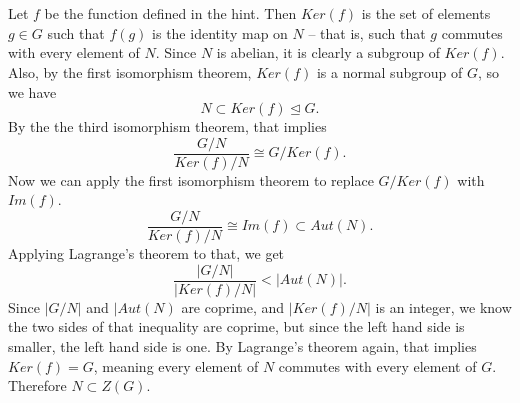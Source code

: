 \documentclass[12pt]{article}
\begin{document}
\section{}
\noindent{}\bigskip

Let $f$ be the function defined in the hint. Then $Ker(f)$ is the set of elements $g \in G$ such that $f(g)$ is the identity map on $N$ -- that is, such that $g$ commutes with every element of $N$. Since $N$ is abelian, it is clearly a subgroup of $Ker(f)$. Also, by the first isomorphism theorem, $Ker(f)$ is a normal subgroup of $G$, so we have
\[ N \subset Ker(f) \trianglelefteq G. \]
By the the third isomorphism theorem, that implies
\[ \frac{G/N}{Ker(f)/N} \cong G/Ker(f). \]
Now we can apply the first isomorphism theorem to replace $G/Ker(f)$ with $Im(f)$.
\[ \frac{G/N}{Ker(f)/N} \cong Im(f) \subset Aut(N). \]
Applying Lagrange's theorem to that, we get
\[ \frac{|G/N|}{|Ker(f)/N|} < |Aut(N)|. \]
Since $|G/N|$ and $|Aut(N)$ are coprime, and $|Ker(f)/N|$ is an integer, we know the two sides of that inequality are coprime, but since the left hand side is smaller, the left hand side is one. By Lagrange's theorem again, that implies $Ker(f)=G$, meaning every element of $N$ commutes with every element of $G$. Therefore $N \subset Z(G)$.
\end{document}
